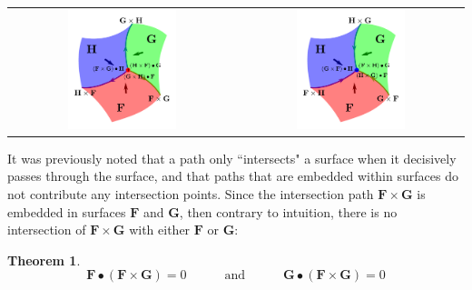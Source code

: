 \documentclass{book}
\newtheorem{thm}{Theorem}
\begin{document}
\begin{tabular}{cc}
\parbox{0.5\textwidth}{
\includegraphics[width = 0.5\textwidth]{Intersections/Surface-surface_intersections/surface_surface_surface_intersections}
} & \parbox{0.5\textwidth}{
\includegraphics[width = 0.5\textwidth]{Intersections/Surface-surface_intersections/surface_surface_surface_intersections_reversed}
}
\end{tabular}

It was previously noted that a path only ``intersects" a surface when it decisively passes through the surface, and that paths that are embedded within surfaces do not contribute any intersection points. Since the intersection path \(\mathbf{F} \times \mathbf{G}\) is embedded in surfaces \(\mathbf{F}\) and \(\mathbf{G}\), then contrary to intuition, there is no intersection of \(\mathbf{F} \times \mathbf{G}\) with either \(\mathbf{F}\) or \(\mathbf{G}\):
\begin{thm}
\[\mathbf{F} \bullet (\mathbf{F} \times \mathbf{G}) = 0 \quad\quad\quad\text{and}\quad\quad\quad \mathbf{G} \bullet (\mathbf{F} \times \mathbf{G}) = 0\]  
\end{thm}
\end{document}
